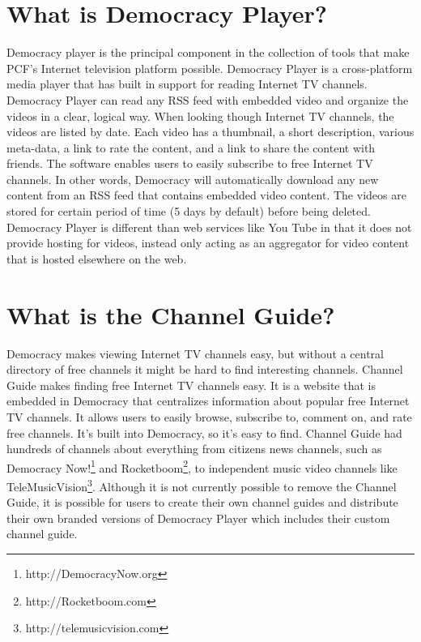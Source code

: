 \documentclass[a4paper,12pt]{report}
\begin{document}
\section{What is Democracy Player?}
Democracy player is the principal component in the collection of tools that make PCF's Internet television platform possible.
Democracy Player is a cross-platform media player that has built in support for reading Internet TV channels.
Democracy Player can read any RSS feed with embedded video and organize the videos in a clear, logical way.
When looking though Internet TV channels, the videos are listed by date.
Each video has a thumbnail, a short description, various meta-data, a link to rate the content, and a link to share the content with friends.
The software enables users to easily subscribe to free Internet TV channels.
In other words, Democracy will automatically download any new content from an RSS feed that contains embedded video content.
The videos are stored for certain period of time (5 days by default) before being deleted.
Democracy Player is different than web services like You Tube in that it does not provide hosting for videos, instead only acting as an aggregator for video content that is hosted elsewhere on the web.


\section {What is the Channel Guide?}
Democracy makes viewing Internet TV channels easy, but without a central directory of free channels it might be hard to find interesting channels.
Channel Guide makes finding free Internet TV channels easy.
It is a website that is embedded in Democracy that centralizes information about popular free Internet TV channels.
It allows users to easily browse, subscribe to, comment on, and rate free channels.
It's built into Democracy, so it's easy to find.
Channel Guide had hundreds of channels about everything from citizens news channels, such as Democracy Now!\footnote{http://DemocracyNow.org} and Rocketboom\footnote{http://Rocketboom.com}, to independent music video channels like TeleMusicVision\footnote{http://telemusicvision.com}.
Although it is not currently possible to remove the Channel Guide, it is possible for users to create their own channel guides and distribute their own branded versions of Democracy Player which includes their custom channel guide. 
\end{document}
